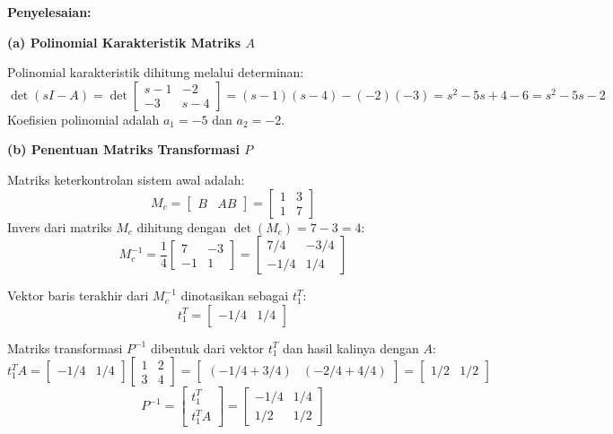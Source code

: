 \documentclass[11pt,a4paper]{article}
\begin{document}
\textbf{Penyelesaian:}

\textbf{(a) Polinomial Karakteristik Matriks $A$}

Polinomial karakteristik dihitung melalui determinan:
$$\det(sI - A) = \det \begin{bmatrix} s - 1 & -2 \\ -3 & s - 4 \end{bmatrix} = (s - 1)(s - 4) - (-2)(-3) = s^2 - 5s + 4 - 6 = s^2 - 5s - 2$$
Koefisien polinomial adalah $a_1 = -5$ dan $a_2 = -2$.

\textbf{(b) Penentuan Matriks Transformasi $P$}

Matriks keterkontrolan sistem awal adalah:
$$M_c = \begin{bmatrix} B & AB \end{bmatrix} = \begin{bmatrix} 1 & 3 \\ 1 & 7 \end{bmatrix}$$
Invers dari matriks $M_c$ dihitung dengan $\det(M_c) = 7 - 3 = 4$:
$$M_c^{-1} = \frac{1}{4} \begin{bmatrix} 7 & -3 \\ -1 & 1 \end{bmatrix} = \begin{bmatrix} 7/4 & -3/4 \\ -1/4 & 1/4 \end{bmatrix}$$

Vektor baris terakhir dari $M_c^{-1}$ dinotasikan sebagai $t_1^T$:
$$t_1^T = \begin{bmatrix} -1/4 & 1/4 \end{bmatrix}$$

Matriks transformasi $P^{-1}$ dibentuk dari vektor $t_1^T$ dan hasil kalinya dengan $A$:
$$t_1^T A = \begin{bmatrix} -1/4 & 1/4 \end{bmatrix} \begin{bmatrix} 1 & 2 \\ 3 & 4 \end{bmatrix} = \begin{bmatrix} (-1/4 + 3/4) & (-2/4 + 4/4) \end{bmatrix} = \begin{bmatrix} 1/2 & 1/2 \end{bmatrix}$$
$$P^{-1} = \begin{bmatrix} t_1^T \\ t_1^T A \end{bmatrix} = \begin{bmatrix} -1/4 & 1/4 \\ 1/2 & 1/2 \end{bmatrix}$$
\end{document}
